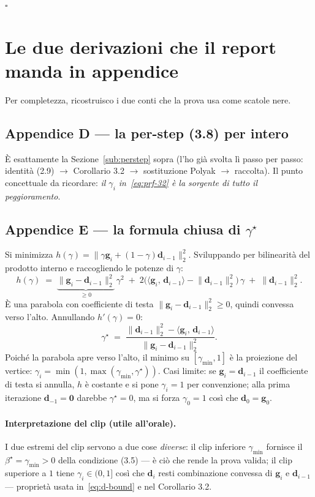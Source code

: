 \documentclass[11pt,a4paper]{article}
\theoremstyle{definition}
\newcommand{\g}{\bm{g}}
\newcommand{\dvec}{\bm{d}}
\newcommand{\gmin}{\gamma_{\min}}
\newcommand{\inner}[2]{\langle #1,\, #2\rangle}
\newcommand{\norm}[1]{\lVert #1\rVert}
\begin{document}
\hfill$\square$

\section{Le due derivazioni che il report manda in appendice}
\label{sec:appendici}

Per completezza, ricostruisco i due conti che la prova usa come scatole nere.

\subsection{Appendice D --- la per-step (3.8) per intero}
È esattamente la Sezione~\ref{sub:perstep} sopra (l'ho già svolta lì passo per passo:
identità (2.9) $\to$ Corollario 3.2 $\to$ sostituzione Polyak $\to$ raccolta). Il punto
concettuale da ricordare: \emph{il $\gamma_i$ in~\eqref{eq:prf-32} è la sorgente di tutto il
peggioramento}.

\subsection{Appendice E --- la formula chiusa di $\gamma^\star$}
\label{sub:appE}
Si minimizza $h(\gamma)=\norm{\gamma\g_i+(1-\gamma)\dvec_{i-1}}_2^2$. Sviluppando per
bilinearità del prodotto interno e raccogliendo le potenze di $\gamma$:
\[
h(\gamma) \;=\; \underbrace{\norm{\g_i-\dvec_{i-1}}_2^2}_{\ge0}\,\gamma^2 \;+\; 2\big(\inner{\g_i}{\dvec_{i-1}}-\norm{\dvec_{i-1}}_2^2\big)\,\gamma \;+\; \norm{\dvec_{i-1}}_2^2 .
\]
È una parabola con coefficiente di testa $\norm{\g_i-\dvec_{i-1}}_2^2\ge0$, quindi convessa
verso l'alto. Annullando $h'(\gamma)=0$:
\[
\gamma^\star \;=\; \frac{\norm{\dvec_{i-1}}_2^2-\inner{\g_i}{\dvec_{i-1}}}{\norm{\g_i-\dvec_{i-1}}_2^2}.
\]
Poiché la parabola apre verso l'alto, il minimo su $[\gmin,1]$ è la proiezione del vertice:
$\gamma_i=\min(1,\max(\gmin,\gamma^\star))$. Casi limite: se $\g_i=\dvec_{i-1}$ il coefficiente
di testa si annulla, $h$ è costante e si pone $\gamma_i=1$ per convenzione; alla prima
iterazione $\dvec_{-1}=\bm0$ darebbe $\gamma^\star=0$, ma si forza $\gamma_0=1$ così che
$\dvec_0=\g_0$.

\paragraph{Interpretazione del clip (utile all'orale).} I due estremi del clip servono a due
cose \emph{diverse}: il clip inferiore $\gmin$ fornisce il $\beta^\star=\gmin>0$ della
condizione (3.5) --- è ciò che rende la prova valida; il clip superiore a $1$ tiene
$\gamma_i\in(0,1]$ così che $\dvec_i$ resti combinazione convessa di $\g_i$ e $\dvec_{i-1}$ ---
proprietà usata in~\eqref{eq:d-bound} e nel Corollario 3.2.
\end{document}
